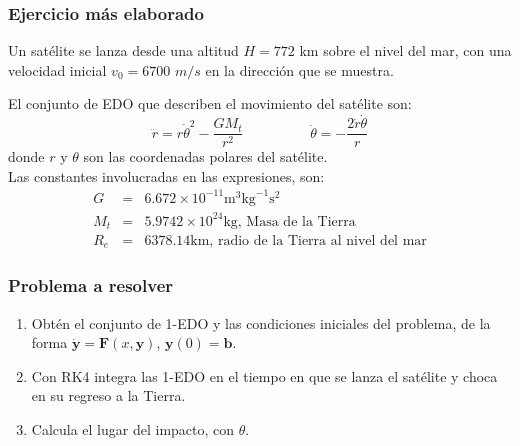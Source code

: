 \begin{frame}
\frametitle{Ejercicio más elaborado}
\begin{center}
\end{center}
Un satélite se lanza desde una altitud $H=772$ km sobre el nivel del mar, con una velocidad inicial $v_{0}=6700$ $m/s$ en la dirección que se muestra.
\end{frame}
\begin{frame}
El conjunto de EDO que describen el movimiento del satélite son:
\[ \ddot{r} = r  \dot{\theta}^{2} - \dfrac{G M_{t}}{r^{2}}  \hspace{2cm} \ddot{\theta} = - \dfrac{2 \dot{r}\dot{\theta}}{r}\]
donde $r$ y $\theta$ son las coordenadas polares del satélite.
\\
\medskip
Las constantes involucradas en las expresiones, son:
\begin{eqnarray*}
G &=& 6.672 \times 10^{-11} \mbox{m}^{3} \mbox{kg}^{-1} \mbox{s}^{2} \\
M_{t} &=& 5.9742 \times 10^{24} \mbox{kg, Masa de la Tierra} \\
R_{e} &=& 6378.14 \mbox{km, radio de la Tierra al nivel del mar} 
\end{eqnarray*}
\end{frame}
\begin{frame}
\frametitle{Problema a resolver}
\begin{enumerate}
\item Obtén el conjunto de 1-EDO y las condiciones iniciales del problema, de la forma $\dot{\mathbf{y}} = \mathbf{F}(x,\mathbf{y})$, $\mathbf{y}(0) = \mathbf{b}$.
\item Con RK4 integra las 1-EDO en el tiempo en que se lanza el satélite y choca en su regreso a la Tierra.
\item Calcula el lugar del impacto, con $\theta$.
\end{enumerate}
\end{frame}

